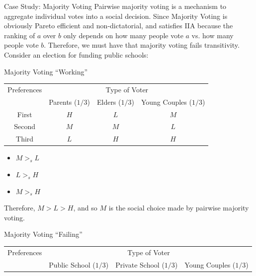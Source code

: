 \documentclass[8pt]{extarticle}
\begin{document}
  \begin{problem}{Case Study: Majority Voting}
    Pairwise majority voting is a mechanism to aggregate individual votes into a social decision. Since Majority Voting is obviously Pareto efficient and non-dictatorial, and satisfies IIA because the ranking of $a$ over $b$ only depends on how many people vote $a$ vs. how many people vote $b$. Therefore, we must have that majority voting fails transitivity.\\

    Consider an election for funding public schools:
    \begin{problem}{Majority Voting ``Working''}
      \begin{center}
        \renewcommand{\arraystretch}{1.5}
        \begin{tabular}{c|c|c|c|}
          \multicolumn{1}{c}{Preferences} & \multicolumn{3}{c}{Type of Voter}\\
          \cline{2-4}
                                          & Parents ($1/3$) & Elders ($1/3$) & Young Couples ($1/3$)\\
          \cline{2-4}
          First & $H$ & $L$ & $M$\\
          \cline{2-4}
          Second & $M$ & $M$ & $L$\\
          \cline{2-4}
          Third & $L$ & $H$ & $H$\\
          \cline{2-4}
        \end{tabular}
      \end{center}
      \begin{itemize}
        \item $M>_s L$
        \item $L >_s H$
        \item $M >_s H$
      \end{itemize}
      Therefore, $M>L>H$, and so $M$ is the social choice made by pairwise majority voting.
    \end{problem}
    \begin{problem}{Majority Voting ``Failing''}
      \begin{center}
        \renewcommand{\arraystretch}{1.5}
        \begin{tabular}{c|c|c|c|}
          \multicolumn{1}{c}{Preferences} & \multicolumn{3}{c}{Type of Voter}\\
          \cline{2-4}
                                          & Public School ($1/3$) & Private School ($1/3$) & Young Couples ($1/3$)\\

\end{tabular}
\end{center}
\end{problem}
\end{problem}
\end{document}
